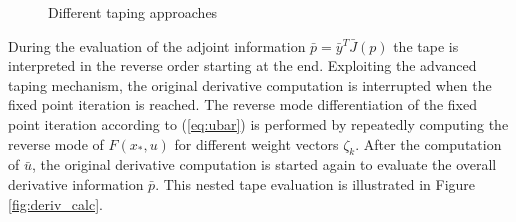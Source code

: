 \documentclass[11pt,twoside]{article}
\begin{document}
\begin{figure}
\begin{center}

 \end{center}
\caption{Different taping approaches}
\label{fig:bas_tap_iteration}
\end{figure}
During the evaluation of the adjoint information $\bar p = \bar{y}^T\bar{J}(p)$
the tape is interpreted in the reverse order starting at the end.
Exploiting the advanced taping mechanism, the original derivative computation is interrupted
when the fixed point iteration is reached. The reverse mode differentiation
of the fixed point iteration according to (\ref{eq:ubar}) is performed
by repeatedly computing the reverse mode of $F(x_*,u)$ for different
weight vectors $\zeta_k$. After the computation of $\bar u$, the original
derivative computation is started again to evaluate the overall derivative
information $\bar p$.
This nested tape evaluation is illustrated in
Figure \ref{fig:deriv_calc}.
\end{document}
